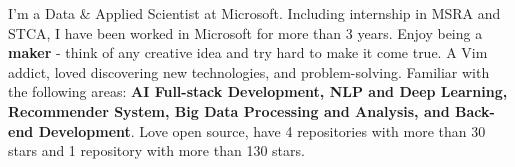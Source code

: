 

\begin{cvparagraph}

I'm a Data \& Applied Scientist at Microsoft. Including internship in MSRA and STCA, I have been worked in Microsoft for more than 3 years.
Enjoy being a \textbf{maker} - think of any creative idea and try hard to make it come true. A Vim addict, loved discovering new technologies, and problem-solving.
Familiar with the following areas: \textbf{AI Full-stack Development, NLP and Deep Learning, Recommender System, Big Data Processing and Analysis, and Back-end Development}.
Love open source, have 4 repositories with more than 30 stars and 1 repository with more than 130 stars.

\end{cvparagraph}
